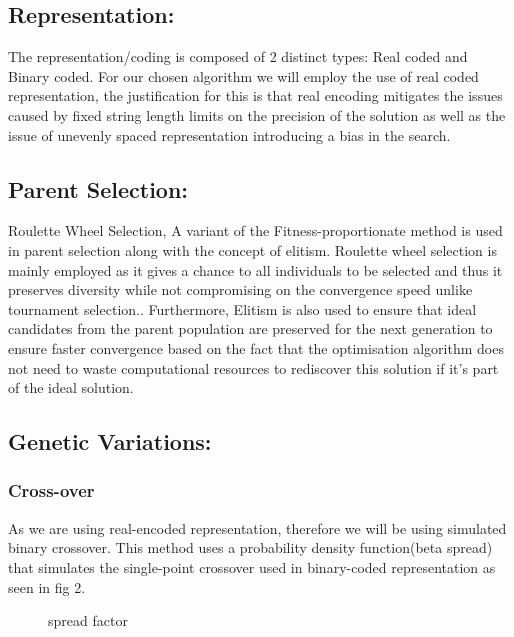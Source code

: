 \documentclass[conference]{IEEEtran}
\begin{document}
\subsection{Representation:}
The representation/coding is composed of 2 distinct types: Real coded and Binary coded. For our chosen algorithm we will employ the use of real coded representation, the justification for this is that real encoding mitigates the issues caused by fixed string length limits on the precision of the solution as well as the issue of unevenly spaced representation introducing a bias in the search.
\subsection{Parent Selection:}
Roulette Wheel Selection, A variant of the Fitness-proportionate method is used in parent selection along with the concept of elitism. Roulette wheel selection is mainly employed as it gives a chance to all individuals to be selected and thus it preserves diversity while not compromising on the convergence speed unlike tournament selection.\cite{miller1995genetic}. Furthermore, Elitism is also used to ensure that ideal candidates from the parent population are preserved for the next generation to ensure faster convergence based on the fact that the optimisation algorithm does not need to waste computational resources to rediscover this solution if it's part of the ideal solution.

\subsection{Genetic Variations:}
    \subsubsection{Cross-over}
    As we are using real-encoded representation, therefore we will be using simulated binary crossover. This method uses a probability density function(beta spread) that simulates the single-point crossover used in binary-coded representation as seen in fig 2.\cite{Deb1995SimulatedBC} 
    \begin{center}
        \begin{figure}{}
        \centering{}
        \caption{spread factor}
        \label{fig:wrapfig}
       \end{figure}
     \end{center}
     \vspace{-1em}
\end{document}
